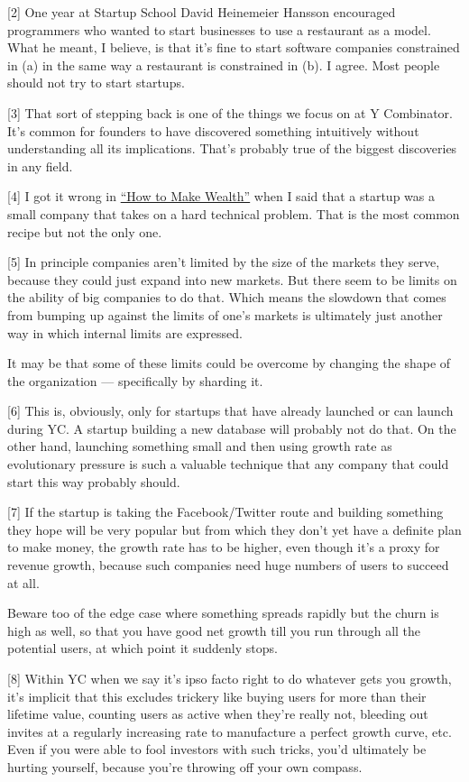 {[}2{]} One year at Startup School David Heinemeier Hansson encouraged
programmers who wanted to start businesses to use a restaurant as a
model. What he meant, I believe, is that it's fine to start software
companies constrained in (a) in the same way a restaurant is constrained
in (b). I agree. Most people should not try to start startups.

{[}3{]} That sort of stepping back is one of the things we focus on at Y
Combinator. It's common for founders to have discovered something
intuitively without understanding all its implications. That's probably
true of the biggest discoveries in any field.

{[}4{]} I got it wrong in \href{wealth.html}{``How to Make Wealth''}
when I said that a startup was a small company that takes on a hard
technical problem. That is the most common recipe but not the only one.

{[}5{]} In principle companies aren't limited by the size of the markets
they serve, because they could just expand into new markets. But there
seem to be limits on the ability of big companies to do that. Which
means the slowdown that comes from bumping up against the limits of
one's markets is ultimately just another way in which internal limits
are expressed.

It may be that some of these limits could be overcome by changing the
shape of the organization --- specifically by sharding it.

{[}6{]} This is, obviously, only for startups that have already launched
or can launch during YC. A startup building a new database will probably
not do that. On the other hand, launching something small and then using
growth rate as evolutionary pressure is such a valuable technique that
any company that could start this way probably should.

{[}7{]} If the startup is taking the Facebook/Twitter route and building
something they hope will be very popular but from which they don't yet
have a definite plan to make money, the growth rate has to be higher,
even though it's a proxy for revenue growth, because such companies need
huge numbers of users to succeed at all.

Beware too of the edge case where something spreads rapidly but the
churn is high as well, so that you have good net growth till you run
through all the potential users, at which point it suddenly stops.

{[}8{]} Within YC when we say it's ipso facto right to do whatever gets
you growth, it's implicit that this excludes trickery like buying users
for more than their lifetime value, counting users as active when
they're really not, bleeding out invites at a regularly increasing rate
to manufacture a perfect growth curve, etc. Even if you were able to
fool investors with such tricks, you'd ultimately be hurting yourself,
because you're throwing off your own compass.

